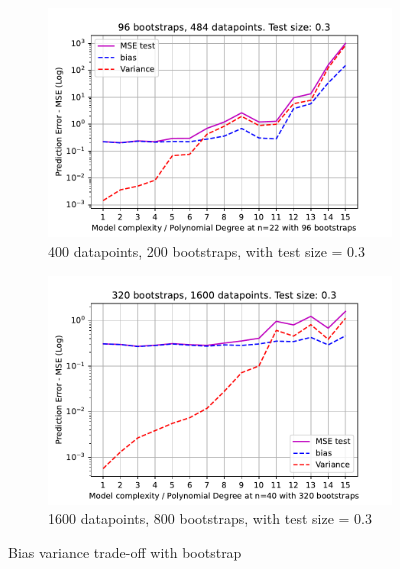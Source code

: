 \documentclass[11pt, a4paper]{article}
\begin{document}
\begin{figure}
  \centering
  \begin{subfigure}{0.49\textwidth}
      \centering
      \includegraphics[width=\textwidth]{figures/EX2_model_complexity_using_bootstrap_function_n_22_testsize_0.3.pdf}
      \caption{400 datapoints, 200 bootstraps, with test size = 0.3}
      \label{fig:bootstrap_bias_var_n_20}
  \end{subfigure}
  \hfill
  \begin{subfigure}{0.49\textwidth}
      \centering
      \includegraphics[width=\textwidth]{figures/EX2_model_complexity_using_bootstrap_function_n_40_testsize_0.3.pdf}
      \caption{1600 datapoints, 800 bootstraps, with test size = 0.3}
      \label{fig:bootstrap_bias_var_n_30}
  \end{subfigure}

     \caption{Bias variance trade-off with bootstrap}
     \label{fig:bootstrap_bias_var}
\end{figure}
\end{document}
